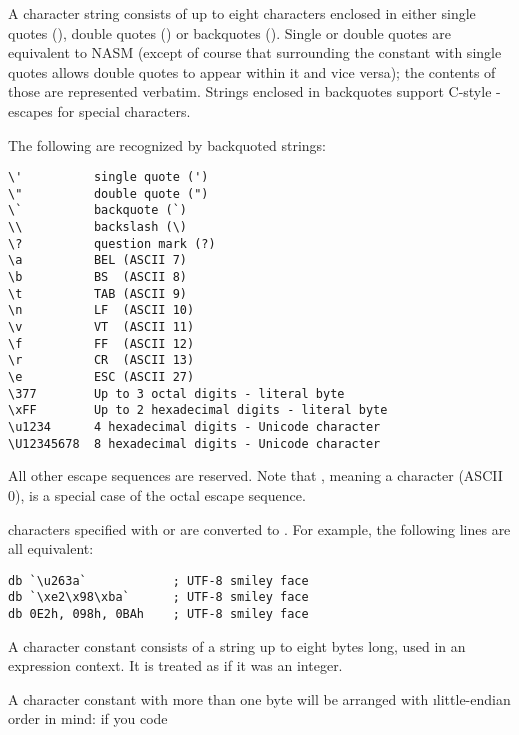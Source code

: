 
A character string consists of up to eight characters enclosed in
either single quotes (), double quotes () or
backquotes (). Single or double quotes are equivalent to
NASM (except of course that surrounding the constant with single
quotes allows double quotes to appear within it and vice versa); the
contents of those are represented verbatim. Strings enclosed in
backquotes support C-style \code{\textbackslash}-escapes for
special characters.

The following  are recognized by backquoted strings:

\begin{lstlisting}
\'          single quote (')
\"          double quote (")
\`          backquote (`)
\\          backslash (\)
\?          question mark (?)
\a          BEL (ASCII 7)
\b          BS  (ASCII 8)
\t          TAB (ASCII 9)
\n          LF  (ASCII 10)
\v          VT  (ASCII 11)
\f          FF  (ASCII 12)
\r          CR  (ASCII 13)
\e          ESC (ASCII 27)
\377        Up to 3 octal digits - literal byte
\xFF        Up to 2 hexadecimal digits - literal byte
\u1234      4 hexadecimal digits - Unicode character
\U12345678  8 hexadecimal digits - Unicode character
\end{lstlisting}

All other escape sequences are reserved. Note that ,
meaning a  character (ASCII 0), is a special case of
the octal escape sequence.

 characters specified with 
or  are converted to .
For example, the following lines are all equivalent:

\begin{lstlisting}
db `\u263a`            ; UTF-8 smiley face
db `\xe2\x98\xba`      ; UTF-8 smiley face
db 0E2h, 098h, 0BAh    ; UTF-8 smiley face
\end{lstlisting}


A character constant consists of a string up to eight bytes long, used
in an expression context. It is treated as if it was an integer.

A character constant with more than one byte will be arranged
with \i{little-endian} order in mind: if you code

